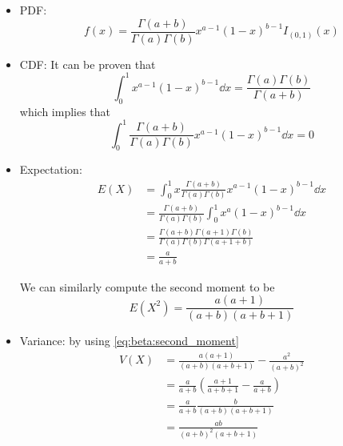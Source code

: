 \documentclass[12pt]{extarticle}
\begin{document}
\begin{itemize}
    \item PDF:
          \begin{equation}
              f(x) = \frac{\Gamma(a+b)}{\Gamma(a)\Gamma(b)}x^{a-1}(1-x)^{b-1}I_{(0,1)}(x)
          \end{equation}
    \item CDF: It can be proven that
          \begin{equation}
              \int_0^1 x^{a -1}(1-x)^{b-1} \dd{x} = \frac{\Gamma(a) \Gamma(b)}{\Gamma(a + b)}
          \end{equation}
          which implies that
          \begin{equation}
              \int_0^1 \frac{\Gamma(a+b)}{\Gamma(a)\Gamma(b)}x^{a-1}(1-x)^{b-1} \dd{x}= 0
          \end{equation}
    \item Expectation:
          \begin{align}
              E(X) & = \int_0^1 x \frac{\Gamma(a+b)}{\Gamma(a)\Gamma(b)}x^{a-1}(1-x)^{b-1} \dd{x}       \\
                   & = \frac{\Gamma(a+b)}{\Gamma(a)\Gamma(b)} \int_0^1 x^a (1-x)^{b-1} \dd{x}           \\
                   & = \frac{\Gamma(a + b) \Gamma(a+1) \Gamma(b)}{\Gamma(a) \Gamma(b) \Gamma(a + 1+ b)} \\
                   & = \frac{a}{a+b}
          \end{align}

          We can similarly compute the second moment to be
          \begin{equation}
              \label{eq:beta:second_moment}
              E(X^2) = \frac{a(a+1)}{(a+b)(a+ b+ 1)}
          \end{equation}
    \item Variance: by using \autoref{eq:beta:second_moment}
          \begin{align}
              V(X) & = \frac{a(a+1)}{(a+b)(a+ b+ 1)} - \frac{a^2}{(a + b)^2}               \\
                   & = \frac{a}{a+ b} \left(\frac{a + 1}{a + b + 1} - \frac{a}{a+b}\right) \\
                   & = \frac{a}{a+b} \frac{b}{(a+b)(a + b + 1)}                            \\
                   & = \frac{ab}{(a+b)^2(a+b+1)}
          \end{align}
\end{itemize}
\end{document}
